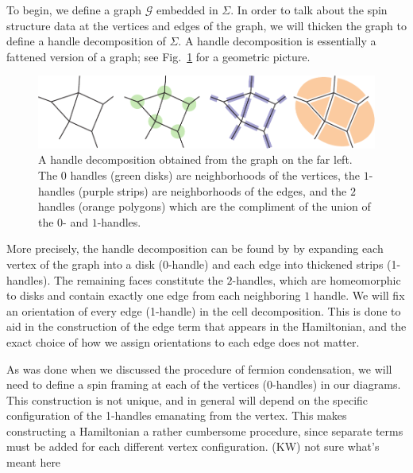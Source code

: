 \documentclass[12pt,a4paper]{article}
\newcommand{\mcg}{\mathcal{G}}
\newcommand{\kw}[1]{{\color{kwcolor}\footnotesize{(KW) #1}}}
\begin{document}
To begin, we define a graph $\mcg$ embedded in $\Sigma$. 
In order to talk about the spin structure data at the vertices and edges of the graph, we will thicken the graph to define a handle decomposition of $\Sigma$.
A handle decomposition is essentially a fattened version of a graph; see Fig.~\ref{HandleDecomposition} for a geometric picture.
\begin{figure}
  \includegraphics{HandleDecomposition.pdf}
  \caption{A handle decomposition obtained from the graph on the far left.
  The $0$ handles (green disks) are neighborhoods of the vertices, the $1$-handles (purple strips) are neighborhoods of the edges, and the $2$ handles (orange polygons) which are the compliment of the union of the $0$- and $1$-handles.}
  \label{HandleDecomposition}
\end{figure}
More precisely, the handle decomposition can be found by by expanding each vertex of the graph into a disk ($0$-handle) and each edge into thickened strips (1-handles).
The remaining faces constitute the $2$-handles, which are homeomorphic to disks and contain exactly one edge from each neighboring $1$ handle.
We will fix an orientation of every edge (1-handle) in the cell decomposition.
This is done to aid in the construction of the edge term that appears in the Hamiltonian, and the exact choice of how we assign orientations to each edge does not matter.

As was done when we discussed the procedure of fermion condensation, we will need to define a spin framing at each of the vertices (0-handles) in our diagrams. 
This construction is not unique, and in general will depend on the specific configuration of the 1-handles emanating from the vertex. 
This makes constructing a Hamiltonian a rather cumbersome procedure, since separate terms must be added for each different vertex configuration. 
\kw{not sure what's meant here}
\end{document}
